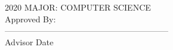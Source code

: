 \begin{flushleft}
    \vspace*{-0.20in}
    \hspace*{3.09in}2020 %
    \hspace*{3.09in}MAJOR: COMPUTER SCIENCE\\ %
    \hspace*{3.09in}Approved By:\\
    \hspace*{3.09in}-----------------------------------------------------------\\
    \vspace*{-0.25in}
    \hspace*{3.09in}Advisor\hspace*{1.5in} Date\hspace*{0.1in}\\
\end{flushleft}

